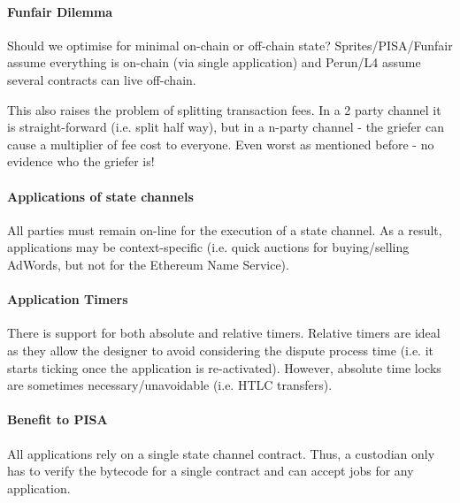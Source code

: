 \documentclass{article}
\begin{document}
\paragraph{Funfair Dilemma} Should we optimise for minimal on-chain or off-chain state? Sprites/PISA/Funfair assume everything is on-chain (via single application) and Perun/L4 assume several contracts can live off-chain. 

This also raises the problem of splitting transaction fees. In a 2 party channel it is straight-forward (i.e. split half way), but in a n-party channel - the griefer can cause a multiplier of fee cost to everyone. Even worst as mentioned before - no evidence who the griefer is! 

\paragraph{Applications of state channels} All parties must remain on-line for the execution of a state channel. As a result, applications may be context-specific (i.e. quick auctions for buying/selling AdWords, but not for the Ethereum Name Service). 

\paragraph{Application Timers} There is support for both absolute and relative timers. Relative timers are ideal as they allow the designer to avoid considering the dispute process time (i.e. it starts ticking once the application is re-activated). However, absolute time locks are sometimes necessary/unavoidable (i.e. HTLC transfers). 

\paragraph{Benefit to PISA} All applications rely on a single state channel contract. Thus, a custodian only has to verify the bytecode for a single contract and can accept jobs for any application. 

\appendix
\end{document}
